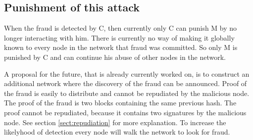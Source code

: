 \subsection{Punishment of this attack}
When the fraud is detected by C, then currently only C can punish M by no longer interacting with him.
There is currently no way of making it globally known to every node in the network that fraud was committed.
So only M is punished by C and can continue his abuse of other nodes in the network.

A proposal for the future, that is already currently worked on, is to construct an additional network
where the discovery of the fraud can be announced.
Proof of the fraud is easily to distribute and cannot be repudiated by the malicious node.
The proof of the fraud is two blocks containing the same previous hash.
The proof cannot be repudiated, because it contains two signatures by the malicious node.
See section \ref{sect:repudiation} for more explanation.
To increase the likelyhood of detection every node will walk the network to look for fraud.